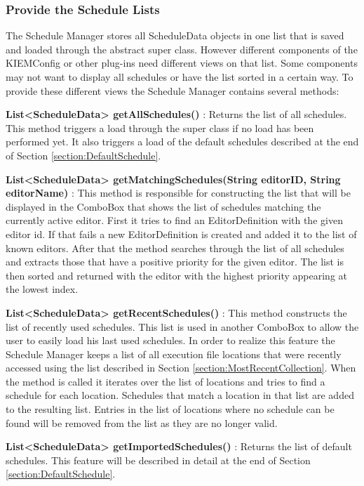 \subsubsection{Provide the Schedule Lists}
\label{section:ProvideScheduleLists}
The Schedule Manager stores all ScheduleData objects in one list that is saved and loaded through
the abstract super class. However different components of the \ac{KIEMConfig} or other plug-ins 
need different views on that list. Some components may not want to display all schedules or have
the list sorted in a certain way. To provide these different views the Schedule Manager contains
several methods:
\begin{description}
 \item \textbf{List<ScheduleData> getAllSchedules()} : Returns the list of all schedules. This
method triggers a load through the super class if no load has been performed yet. It also triggers
a load of the default schedules described at the end of Section \ref{section:DefaultSchedule}.
 \item \textbf{List<ScheduleData> getMatchingSchedules(String editorID, String editorName)} :
This method is responsible for constructing the list that will be displayed in the ComboBox that
shows the list of schedules matching the currently active editor. First it tries to find an
EditorDefinition with the given editor id. If that fails a new EditorDefinition is created and
added it to the list of known editors. After that the method searches through the list of
all schedules and extracts those that have a positive priority for the given editor. The list
is then sorted  and returned with the editor with the highest priority appearing at the lowest index.
 \item \textbf{List<ScheduleData> getRecentSchedules()} : This method constructs the list of 
recently used schedules. This list is used in another ComboBox to allow the user to easily load
his last used schedules. In order to realize this feature the Schedule Manager keeps a list of
all execution file locations that were recently accessed using the list described in Section
\ref{section:MostRecentCollection}. When the method is called it iterates over the list of locations
and tries to find a schedule for each location. Schedules that match a location in that list are 
added to the resulting list. Entries in the list of locations where no schedule can be found will
be removed from the list as they are no longer valid.
 \item \textbf{List<ScheduleData> getImportedSchedules()} : Returns the list of default schedules.
This feature will be described in detail at the end of Section \ref{section:DefaultSchedule}.
\end{description}

